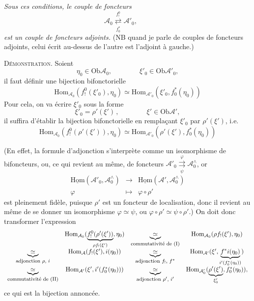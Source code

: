 \documentclass[11pt]{article}
\newcommand{\printedpage}[1]{\marginpar{\footnotesize p.~#1}}
\newcommand{\msp}[1]{\marginpar{\footnotesize [#1]}}
\newcommand{\Ob}{\mathrm{Ob}}
\newcommand{\Hom}{\mathrm{Hom}}
\newcommand{\uHom}{\underline{\mathrm{Hom}}}
\newcommand{\cA}{\mathcal{A}}
\newcommand{\adj}[2]{\mathrel{\underset{#2}{\overset{#1}{\rightleftarrows}}}}
\begin{document}
\textit{Sous ces conditions, le couple de foncteurs}
\[
\cA_0 \adj{f_!^0}{f_0^*} \cA'_0, \qquad 
\]
\textit{est un couple de foncteurs adjoints.} (NB quand je parle de couples de foncteurs adjoints, celui écrit au-dessus de l'autre est l'adjoint à gauche.)

\textsc{Démonstration}. Soient
\[
\eta_0 \in \Ob \cA_0, \qquad\qquad \xi'_0 \in \Ob \cA'_0,
\]
il faut définir une bijection bifonctorielle
\[
\Hom_{\cA_0}(f_!^0(\xi'_0), \eta_0) \simeq \Hom_{\cA'_0}(\xi'_0, f_0^*(\eta_0))
\]
Pour cela, on va écrire $\xi'_0$ sous la forme
\[
\xi'_0 = \rho'(\xi')\,, \qquad\qquad \xi' \in \Ob \cA',
\]
il suffira d'établir la bijection bifonctorielle en remplaçant $\xi'_0$ par $\rho'(\xi')$, i.e.
\[
\Hom_{\cA_0}(f_!^0(\rho'(\xi')), \eta_0) \simeq \Hom_{\cA'_0}(\rho'(\xi'), f_0^*(\eta_0))
\]


\printedpage{92}

\msp{page 150}
(En effet, la formule d'adjonction s'interprète comme un isomorphisme de bifoncteurs, ou, ce qui revient au même, de foncteurs $\cA'_0 \mathrel{\underset{\psi}{\overset{\varphi}{\rightrightarrows}}} \cA_0^{\wedge}$, or
\[
\begin{array}{ccc}
\uHom(\cA'_0, \cA_0^{\wedge}) & \longrightarrow & \uHom(\cA', \cA_0^{\wedge}) \\[1ex]
\varphi & \longmapsto & \varphi \circ \rho'
\end{array}
\]
est pleinement fidèle, puisque $\rho'$ est un foncteur de localisation, donc il revient au même de se donner un isomorphisme $\varphi \simeq \psi$, ou $\varphi \circ \rho' \simeq \psi \circ \rho'$.) On doit donc transformer l'expression
\[
\begin{array}{cccc}
 & \Hom_{\cA_0}(\underbrace{f_!^0(\rho'(\xi'))}_{\rho f_!(\xi')}, \eta_0) & \underbrace{\simeq}_{\text{\footnotesize commutativité de (I)}} & \Hom_{\cA_0}(\rho f_!(\xi'), \eta_0) \\[3ex]
\underbrace{\simeq}_{\text{\footnotesize adjonction $\rho$, $i$}} & \Hom_{\cA}(f_!(\xi'), i(\eta_0)) & \underbrace{\simeq}_{\text{\footnotesize adjonction $f_!$, $f^*$}} & \Hom_{\cA'}(\xi', \underbrace{f^*i(\eta_0)}_{i'(f_0^*(\eta_0))}) \\[3ex]
\underbrace{\simeq}_{\text{\footnotesize commutativité de (II)}} & \Hom_{\cA'}(\xi', i'(f_0^*(\eta_0))) & \underbrace{\simeq}_{\text{\footnotesize adjonction $\rho'$, $i'$}} & \Hom_{\cA'_0}(\underbrace{\rho'(\xi')}_{\xi'_0}, f_0^*(\eta_0)),
\end{array}
\]
ce qui est la bijection annoncée.
\end{document}
